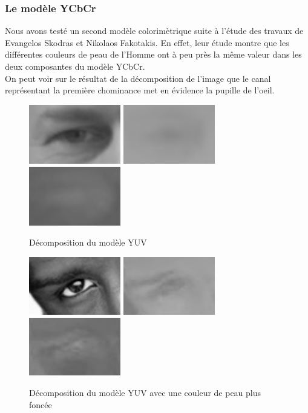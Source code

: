 \subsubsection{Le modèle YCbCr}

Nous avons testé un second modèle colorimètrique suite à l'étude des travaux de Evangelos Skodras et Nikolaos Fakotakis\cite{Skodras_2012ieee}.
En effet, leur étude montre que les différentes couleurs de peau de l'Homme ont à peu près la même valeur dans les deux
composantes du modèle YCbCr.\\

On peut voir sur le résultat de la décomposition de l'image que le canal représentant la première chominance met 
en évidence la pupille de l'oeil.
\begin{figure}[H]
 \center
 \includegraphics[width=4cm]{image/luminance.png}
 \includegraphics[width=4cm]{image/chrominance1.png}
 \includegraphics[width=4cm]{image/chrominance2.png}
 \caption{Décomposition du modèle YUV}
\end{figure}

\begin{figure}[H]
 \center
 \includegraphics[width=4cm]{image/luminance_black.png}
 \includegraphics[width=4cm]{image/chrominance1_black.png}
 \includegraphics[width=4cm]{image/chrominance2_black.png}
 \caption{Décomposition du modèle YUV avec une couleur de peau plus foncée}
\end{figure}

